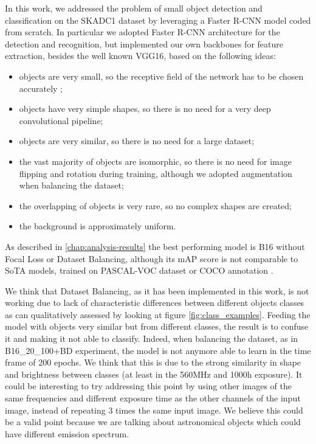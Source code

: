 \documentclass[a4paper,10pt]{report}
\begin{document}
In this work, we addressed the problem of small object detection and classification on the SKADC1 dataset by leveraging a Faster R-CNN model coded from scratch.
In particular we adopted Faster R-CNN architecture for the detection and recognition, but implemented our own backbones for feature extraction, besides the well known VGG16, based on the following ideas:
\begin{itemize}
\item objects are very small, so the receptive field of the network has to be chosen accurately \cite{effective-rf};
\item objects have very simple shapes, so there is no need for a very deep convolutional pipeline;
\item objects are very similar, so there is no need for a large dataset;
\item the vast majority of objects are isomorphic, so there is no need for image flipping and rotation during training, although we adopted augmentation when balancing the dataset;
\item the overlapping of objects is very rare, so no complex shapes are created;
\item the background is approximately uniform.
\end{itemize}

As described in \ref{chap:analysis-results} the best performing model is B16 without Focal Loss or Dataset Balancing, 
although its mAP score is not comparable to SoTA models, trained on PASCAL-VOC dataset or COCO annotation \cite{faster-rcnn}.

We think that Dataset Balancing, as it has been implemented in this work, is not working due to lack of characteristic differences between different objects classes 
as can qualitatively assessed by looking at figure \ref{fig:class_examples}. 
Feeding the model with objects very similar but from different classes, the result is to confuse it and making it not able to classify.
Indeed, when balancing the dataset, as in B16\_20\_100+BD experiment, the model is not anymore able to learn in the time frame of 200 epochs. 
We think that this is due to the strong similarity in shape and brightness between classes (at least in the 560MHz and 1000h exposure). 
It could be interesting to try addressing this point by using other images of the same frequencies and different exposure time as the other channels of the input image, instead of repeating 3 times the same input image. 
We believe this could be a valid point because we are talking about astronomical objects which could have different emission spectrum.
\end{document}
